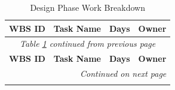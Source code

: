 \newpage
\small
\begin{longtable}{|l|p{6.5cm}|c|l|}
\caption{Design Phase Work Breakdown}
\label{tab:wbs_design} \\
\hline
\rowcolor{designyellow!40}
\textbf{WBS ID} & \textbf{Task Name} & \textbf{Days} & \textbf{Owner} \\
\hline
\endfirsthead

\multicolumn{4}{c}{\textit{Table \ref{tab:wbs_design} continued from previous page}} \\
\hline
\rowcolor{designyellow!40}
\textbf{WBS ID} & \textbf{Task Name} & \textbf{Days} & \textbf{Owner} \\
\hline
\endhead

\hline
\multicolumn{4}{r}{\textit{Continued on next page}} \\
\endfoot

\hline
\endlastfoot


\end{longtable}
